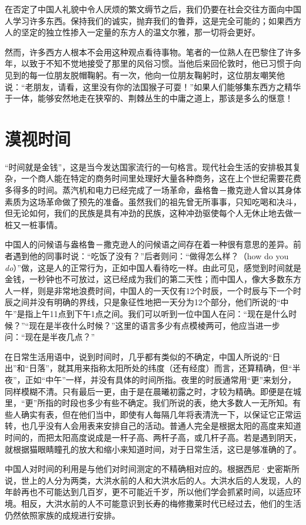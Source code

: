 \documentclass[12pt,oneside]{book}
\begin{document}
\begin{common-format}
在否定了中国人礼貌中令人厌烦的繁文缛节之后，我们仍要在社会交往方面向中国人学习许多东西。保持我们的诚实，抛弃我们的鲁莽，这是完全可能的；如果西方人的坚定的独立性掺入一定量的东方人的温文尔雅，那一切将会更好。 

然而，许多西方人根本不会用这种观点看待事物。笔者的一位熟人在巴黎住了许多年，以致于不知不觉地接受了那里的风俗习惯。当他后来回伦敦时，他已习惯于向见到的每一位朋友脱帽鞠躬。有一次，他向一位朋友鞠躬时，这位朋友嘲笑他说：“老朋友，请看，这里没有你的法国猴子可耍！”如果人们能够集东西方之精华于一体，能够安然地走在狭窄的、荆棘丛生的中庸之道上，那该是多么的惬意！


\chapter{漠视时间}
“时间就是金钱”，这是当今发达国家流行的一句格言。现代社会生活的安排极其复杂，一个商人能在特定的商务时间里处理好大量各种商务，这在上个世纪需要花费多得多的时间。蒸汽机和电力已经完成了一场革命，盎格鲁－撒克逊人曾以其身体素质为这场革命做了预先的准备。虽然我们的祖先曾无所事事，只知吃喝和决斗，但无论如何，我们的民族是具有冲劲的民族，这种冲劲驱使每个人无休止地去做一桩又一桩事情。 

中国人的问候语与盎格鲁－撒克逊人的问候语之间存在着一种很有意思的差异。前者遇到他的同事时说：“吃饭了没有？”后者则问：“做得怎么样？（how do you \textit{do}）”做，这是人的正常行为，正如中国人看待吃一样。由此可见，感觉到时间就是金钱，一秒钟也不可放过，这已经成为我们的第二天性；而中国人，像大多数东方人一样，则是非常地浪费时间，中国人的一天仅有12个时辰，一个时辰与下一个时辰之间并没有明确的界线，只是象征性地把一天分为12个部分，他们所说的“中午”是指上午11点到下午1点之间。我们可以听到一位中国人在问：“现在是什么时候？”“现在是半夜什么时候？”这里的语言多少有点模棱两可，他应当进一步问：“现在是半夜几点？” 

在日常生活用语中，说到时间时，几乎都有类似的不确定，中国人所说的“日出”和“日落”，就其用来指称太阳所处的纬度（还有经度）而言，还算精确，但“半夜”，正如“中午”一样，并没有具体的时间所指。夜里的时辰通常用“更”来划分，同样模糊不清。只有最后一更，由于是在晨曦初露之时，才较为精确。即便是在城里，“更”所指的时段也多少有些不确定。我们所说的表，绝大多数人一无所知。有些人确实有表，但在他们当中，即使有人每隔几年将表清洗一下，以保证它正常运转，也几乎没有人会用表来安排自己的活动。普通人完全是根据太阳的高度来知道时间的，而把太阳高度说成是一杆子高、两杆子高，或几杆子高。若是遇到阴天，就根据猫眼睛瞳孔的放大和缩小来知道时间，对于日常生活，这已是够准确的了。 

中国人对时间的利用是与他们对时间测定的不精确相对应的。根据西尼·史密斯所说，世上的人分为两类，大洪水前的人和大洪水后的人。大洪水后的人发现，人的年龄再也不可能达到几百岁，更不可能近千岁，所以他们学会抓紧时间，以适应环境。相反，大洪水前的人不可能意识到长寿的梅修撒莱时代已经过去，他们的生活仍然依照家族的成规进行安排。 


\end{common-format}
\end{document}
